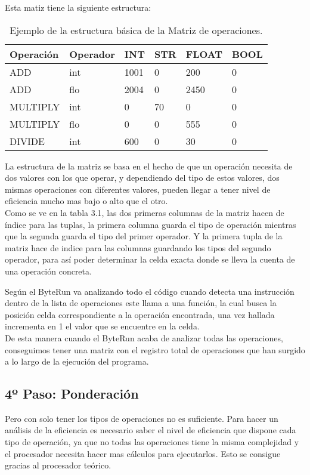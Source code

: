 Esta matiz tiene la siguiente estructura:\\

\begin{table}[H]
\begin{center}
\begin{tabular}{|l|l|l|l|l|l|}
\hline
Operación & Operador & INT & STR & FLOAT & BOOL \\
\hline \hline
ADD & int & 1001 & 0 & 200 & 0\\ \hline
ADD & flo & 2004 & 0 & 2450 & 0 \\ \hline
MULTIPLY & int & 0 & 70 & 0 & 0 \\ \hline
MULTIPLY & flo & 0 & 0 & 555 & 0 \\ \hline
DIVIDE & int & 600 & 0 & 30 & 0 \\ \hline
\end{tabular}
\caption{Ejemplo de la estructura básica de la Matriz de operaciones.}
\label{tabla:sencilla}
\end{center}
\end{table}

La estructura de la matriz se basa en el hecho de que un operación necesita de dos valores con los que operar, y dependiendo del tipo de estos valores, dos mismas operaciones con diferentes valores, pueden llegar a tener nivel de eficiencia mucho mas bajo o alto que el otro. \\

Como se ve en la tabla 3.1, las dos primeras columnas de la matriz hacen de índice para las tuplas, la primera columna guarda el tipo de operación mientras que la segunda guarda el tipo del primer operador. Y la primera tupla de la matriz hace de indice para las columnas guardando los tipos del segundo operador, para así poder determinar la celda exacta donde se lleva la cuenta de una operación concreta.

Según el ByteRun va analizando todo el código cuando detecta una instrucción dentro de la lista de operaciones este llama a una función, la cual busca la posición celda correspondiente a la operación encontrada, una vez hallada incrementa en 1 el valor que se encuentre en la celda.\\

De esta manera cuando el ByteRun acaba de analizar todas las operaciones, conseguimos tener una matriz con el registro total de operaciones que han surgido a lo largo de la ejecución del programa.\\

\subsection{4º Paso: Ponderación}
Pero con solo tener los tipos de operaciones no es suficiente. Para hacer un análisis de la eficiencia es necesario saber el nivel de eficiencia que dispone cada tipo de operación, ya que no todas las operaciones tiene la misma complejidad y el procesador necesita hacer mas cálculos para ejecutarlos. Esto se consigue gracias al procesador teórico.\\

